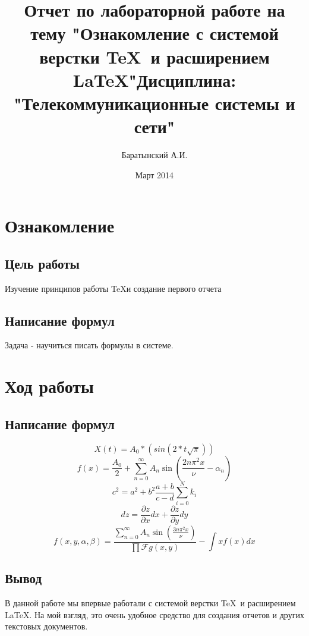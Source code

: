 \documentclass[10pt,a4paper]{report}
\author{Баратынский А.И.}
\title{Отчет по лабораторной работе на тему "Ознакомление с системой верстки \TeX\ и расширением \LaTeX "\newline Дисциплина: "Телекоммуникационные системы и сети"}
\date{Март 2014}
\begin{document}
\maketitle
\pagebreak
\chapter{Ознакомление}
\section{Цель работы}
Изучение принципов работы \TeX и создание первого отчета
\section{Написание формул}
Задача - научиться писать формулы в системе. 
\chapter{Ход работы}
\section{Написание формул}
\begin{displaymath}
X(t) = A_0 * (sin(2*t\sqrt\pi))
\end{displaymath}
\begin{displaymath}
f(x) = \frac{A_0}{2} + \sum \limits_{n=0}^{\infty} A_n \sin \left( \frac{2 n \pi^2 x}{\nu} - \alpha_n \right)
\end{displaymath}
\begin{displaymath}
c^2 = a^2 + b^2 \frac{a+b}{c-d} \sum_{i=0}^{N}k _i
\end{displaymath}
\begin{displaymath}
dz = \frac{\partial z}{\partial x} dx + \frac{\partial z}{\partial y} dy
\end{displaymath}
\begin{displaymath}
f(x,y,\alpha, \beta) = \frac{\sum \limits_{n=0}^{\infty}
A_n \sin \left( \frac{3 n \pi^2 x}{\nu} \right)} {\prod \mathcal{F} {g(x,y)} }-\int{x} f(x) dx
\end{displaymath}
\section{Вывод}
В данной работе мы впервые работали с системой верстки \TeX\ и расширением \LaTeX. На мой взгляд, это очень удобное средство для создания отчетов и других текстовых документов. 
\end{document}
